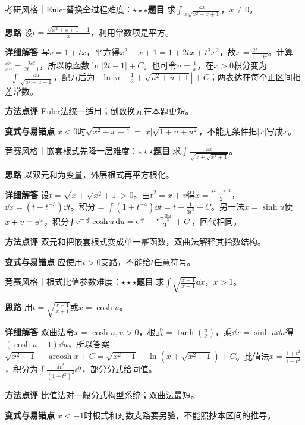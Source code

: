 \begin{example}{考研风格｜Euler替换全过程}{难度：$\star\star\star$}\label{deep:ex:integral_source_deep:euler1}\textbf{题目} 求$\int\frac{\dd x}{x\sqrt{x^2+x+1}}$，$x\ne0$。\par\textbf{思路} 设$t=\frac{\sqrt{x^2+x+1}-1}{x}$，利用常数项是平方。\par\textbf{详细解答} 写$v=1+tx$，平方得$x^2+x+1=1+2tx+t^2x^2$，故$x=\frac{2t-1}{1-t^2}$。计算$\frac{\dd x}{xv}=\frac{2\dd t}{2t-1}$，所以原函数$\ln|2t-1|+C$。也可令$u=\frac{1}{x}$，在$x>0$积分变为$-\int\frac{\dd u}{\sqrt{u^2+u+1}}$，配方后为$-\ln|u+\frac{1}{2}+\sqrt{u^2+u+1}|+C$；两表达在每个正区间相差常数。\par\textbf{方法点评} Euler法统一适用；倒数换元在本题更短。\par\textbf{变式与易错点} $x<0$时$\sqrt{x^2+x+1}=|x|\sqrt{1+u+u^2}$，不能无条件把$|x|$写成$x$。\end{example}

\begin{example}{竞赛风格｜嵌套根式先降一层}{难度：$\star\star\star$}\label{deep:ex:integral_source_deep:nested}\textbf{题目} 求$\int\frac{\dd x}{\sqrt{x+\sqrt{x^2+1}}}$。\par\textbf{思路} 以双元和为变量，外层根式再平方根化。\par\textbf{详细解答} 设$t=\sqrt{x+\sqrt{x^2+1}}>0$。由$t^2=x+v$得$x=\frac{t^2-t^{-2}}{2}$，$\dd x=(t+t^{-3})\dd t$。积分$=\int(1+t^{-4})\dd t=t-\frac1{3t^3}+C$。另一法$x=\sinh u$使$x+v=\mathrm{e}^u$，积分$\int\mathrm{e}^{-\frac{u}{2}}\cosh u\mathop{}\!\mathrm{d} u=\mathrm{e}^{\frac{u}{2}}-\frac{\mathrm{e}^{-\frac{3u}{2}}}{3}+C$，回代相同。\par\textbf{方法点评} 双元和把嵌套根式变成单一幂函数，双曲法解释其指数结构。\par\textbf{变式与易错点} 应使用$t>0$支路，不能给$t$任意符号。\end{example}

\begin{example}{竞赛风格｜根式比值参数}{难度：$\star\star\star$}\label{deep:ex:integral_source_deep:rootratio}\textbf{题目} 求$\int\sqrt{\frac{x-1}{x+1}}\dd x$，$x>1$。\par\textbf{思路} 用$t=\sqrt{\frac{x-1}{x+1}}$或$x=\cosh u$。\par\textbf{详细解答} 双曲法令$x=\cosh u,u>0$，根式$=\tanh(\frac{u}{2})$，乘$\dd x=\sinh u\dd u$得$(\cosh u-1)\dd u$，所以答案$\sqrt{x^2-1}-\operatorname{arcosh}x+C=\sqrt{x^2-1}-\ln(x+\sqrt{x^2-1})+C$。比值法$x=\frac{1+t^2}{1-t^2}$，积分为$\int\frac{4t^2}{(1-t^2)^2}\dd t$，部分分式给同值。\par\textbf{方法点评} 比值法对一般分式构型系统；双曲法最短。\par\textbf{变式与易错点} $x<-1$时根式和对数支路要另验，不能照抄本区间的推导。\end{example}

